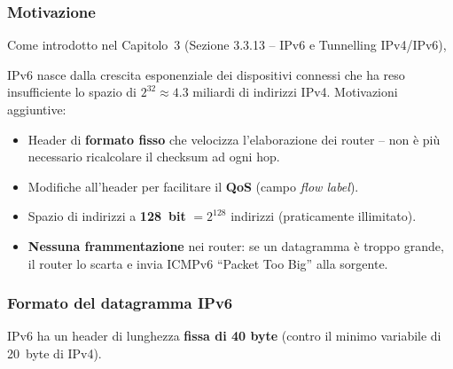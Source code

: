 \documentclass[a4paper,12pt]{report}
\begin{document}
\subsubsection{Motivazione}

Come introdotto nel Capitolo~3 (Sezione 3.3.13 -- IPv6 e
Tunnelling IPv4/IPv6),

IPv6 nasce dalla crescita esponenziale
dei dispositivi connessi che ha reso insufficiente lo spazio
di $2^{32} \approx 4.3$ miliardi di indirizzi IPv4.
Motivazioni aggiuntive:
\begin{itemize}
    \item Header di \textbf{formato fisso} che velocizza
          l'elaborazione dei router -- non è più necessario
          ricalcolare il checksum ad ogni hop.
    \item Modifiche all'header per facilitare il \textbf{QoS}
          (campo \textit{flow label}).
    \item Spazio di indirizzi a \textbf{128~bit} $= 2^{128}$
          indirizzi (praticamente illimitato).
    \item \textbf{Nessuna frammentazione} nei router: se un
          datagramma è troppo grande, il router lo scarta e
          invia ICMPv6 ``Packet Too Big'' alla sorgente.
\end{itemize}

\subsubsection{Formato del datagramma IPv6}

IPv6 ha un header di lunghezza \textbf{fissa di 40 byte}
(contro il minimo variabile di 20~byte di IPv4).
\end{document}
